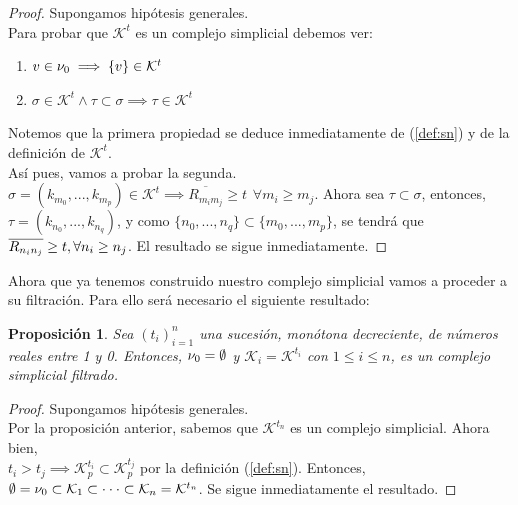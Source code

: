 \documentclass[12pt, a4paper]{article}
\numberwithin{equation}{section}
\theoremstyle{definition}
\theoremstyle{remark}
\theoremstyle{plain}
\newtheorem{prop}{Proposición}
\begin{document}
		\newpage

		\begin{proof}
			Supongamos hipótesis generales. \\
			Para probar que $\mathcal{K}^{t}$ es un complejo simplicial debemos ver: 
			\begin{enumerate}
				\item $v \in {\Large \nu}_{0} \implies \{v\} \in \mathcal{K}^{t}$
				\item $ \sigma \in \mathcal{K}^{t} \land \tau \subset \sigma \implies \tau \in \mathcal{K}^{t}$	
			\end{enumerate}
			Notemos que la primera propiedad se deduce inmediatamente de (\ref{def:sn}) y de la definición 
			de $\mathcal{K}^{t}$. \\
			Así pues, vamos a probar la segunda.\\
			$\sigma=(k_{m_{0}},...,k_{m_{p}}) \in \mathcal{K}^{t} \implies \overline{R_{m_{i}m_{j}}}\geq t \hspace{5pt} 
			\forall m_{i} \geq m_{j}$. Ahora sea $\tau \subset \sigma$, entonces, \\
			$\tau = (k_{n_{0}},...,k_{n_{q}})$, y como $\{n_{0},...,n_{q}\} \subset \{m_{0},...,m_{p}\}$, se tendrá que $\overline{R_{n_{i}n_{j}}} \geq t, \\
			\forall n_{i} \geq n_{j}$. El resultado se sigue inmediatamente. 
		\end{proof}

		Ahora que ya tenemos construido nuestro complejo simplicial vamos a proceder a su filtración. Para ello será necesario
		el siguiente resultado:

		\begin{prop}
			Sea $(t_{i})_{i=1}^{n}$ una sucesión, monótona decreciente, de números reales entre 1 y 0. Entonces, 
			${\Large \nu}_{0}=\emptyset$ y $\mathcal{K}_{i}=\mathcal{K}^{t_{i}}$ con $1\leq i \leq n$, es un complejo simplicial filtrado.   
		\end{prop}

		\begin{proof}
			Supongamos hipótesis generales.\\
			Por la proposición anterior, sabemos que $\mathcal{K}^{t_{n}}$ es un complejo simplicial. Ahora bien, \\
			$t_{i} > t_{j} \implies \mathcal{K}_{p}^{t_{i}} \subset \mathcal{K}_{p}^{t_{j}}$ por la definición (\ref{def:sn}). Entonces, 
			$\emptyset={\Large \nu}_{0} \subset \mathcal{K}_{1} \subset \cdot \cdot \cdot \subset \mathcal{K}_{n}=\mathcal{K}^{t_{n}}$. Se sigue
			inmediatamente el resultado.
		\end{proof}
\end{document}
